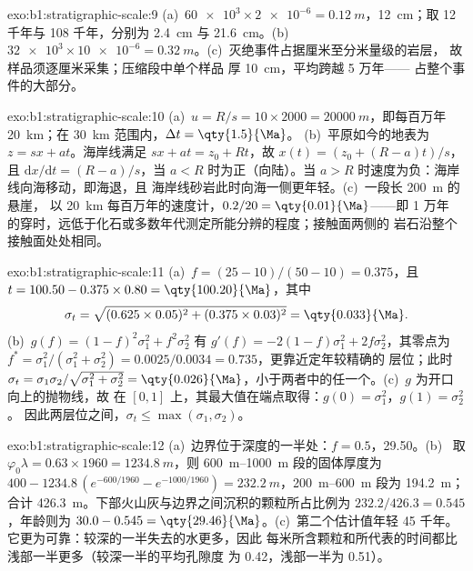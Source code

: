 \begin{solution}{exo:b1:stratigraphic-scale:9}
(a)~$\num{60e3} \times \num{2e-6} = \qty{0.12}{m}$，\qty{12}{cm}；取 12 千年与
108 千年，分别为 \qty{2.4}{cm} 与 \qty{21.6}{cm}。(b)~$\num{32e3} \times
\num{10e-6} = \qty{0.32}{m}$。(c)~灭绝事件占据厘米至分米量级的岩层，
故样品须逐厘米采集；压缩段中单个样品
厚 \qty{10}{cm}，平均跨越 5 万年——
占整个事件的大部分。
\end{solution}

\begin{solution}{exo:b1:stratigraphic-scale:10}
(a)~$u = R/s = 10 \times 2000 = \qty{20000}{m}$，即每百万年
\qty{20}{km}；在 \qty{30}{km} 范围内，$\Delta t = \qty{1.5}{\Ma}$。
(b)~平原如今的地表为 $z = s x + a t$。海岸线满足
$s x + a t = z_0 + R t$，故 $x(t) = (z_0 + (R - a)t)/s$，且
$\mathrm dx/\mathrm dt = (R - a)/s$，当 $a < R$ 时为正（向陆）。当
$a > R$ 时速度为负：海岸线向海移动，即海退，且
海岸线砂岩此时向海一侧更年轻。(c)~一段长 \qty{200}{m} 的悬崖，
以 \qty{20}{km} 每百万年的速度计，$0.2/20 = \qty{0.01}{\Ma}$——即 1 万年
的穿时，远低于化石或多数年代测定所能分辨的程度；接触面两侧的
岩石沿整个接触面处处相同。
\end{solution}

\begin{solution}{exo:b1:stratigraphic-scale:11}
(a)~$f = (25 - 10)/(50 - 10) = 0.375$，且 $t = 100.50 - 0.375 \times 0.80 =
\qty{100.20}{\Ma}$，其中
\[
  \sigma_t = \sqrt{(0.625 \times 0.05)^2 + (0.375 \times 0.03)^2} = \qty{0.033}{\Ma}.
\] (b)~$g(f) = (1 - f)^2\sigma_1^2 + f^2\sigma_2^2$
有 $g'(f) = -2(1 - f)\sigma_1^2 + 2f\sigma_2^2$，其零点为 $f^* =
\sigma_1^2/(\sigma_1^2 + \sigma_2^2) = 0.0025/0.0034 = 0.735$，更靠近定年较精确的
层位；此时 $\sigma_t = \sigma_1\sigma_2/\sqrt{\sigma_1^2 + \sigma_2^2} =
\qty{0.026}{\Ma}$，小于两者中的任一个。(c)~$g$ 为开口向上的抛物线，故
在 $[0, 1]$ 上，其最大值在端点取得：$g(0) = \sigma_1^2$，$g(1) = \sigma_2^2$。
因此两层位之间，$\sigma_t \le \max(\sigma_1, \sigma_2)$。
\end{solution}

\begin{solution}{exo:b1:stratigraphic-scale:12}
(a)~边界位于深度的一半处：$f = 0.5$，\qty{29.50}{\Ma}。(b)~
取 $\varphi_0\lambda = 0.63 \times 1960 = \qty{1234.8}{m}$，则
\qtyrange{600}{1000}{m} 段的固体厚度为 $400 - 1234.8\,(e^{-600/1960} - e^{-1000/1960}) =
\qty{232.2}{m}$，\qtyrange{200}{600}{m} 段为 \qty{194.2}{m}；合计
\qty{426.3}{m}。下部火山灰与边界之间沉积的颗粒所占比例为
$232.2/426.3 = 0.545$，年龄则为 $30.0 - 0.545 =
\qty{29.46}{\Ma}$。(c)~第二个估计值年轻 \num{45} 千年。
它更为可靠：较深的一半失去的水更多，因此
每米所含颗粒和所代表的时间都比浅部一半更多（较深一半的平均孔隙度
为 \num{0.42}，浅部一半为 \num{0.51}）。
\end{solution}


